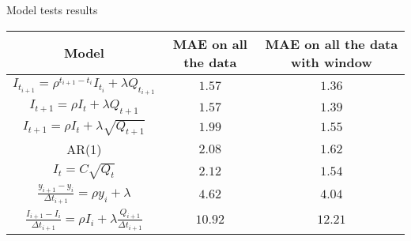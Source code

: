 \documentclass[aspectratio=169]{beamer}
\begin{document}
\begin{frame}{Model tests results}
    \begin{tabular}{|c | c | c|} 


        \hline
        Model & MAE on all the data & MAE on all the data with window  \\
        \hline
        $I_{t_{i+1}} = \rho ^{t_{i+1} - t_i} I_{t_i} + \lambda Q_{t_{i+1}}$ & $1.57$ & $1.36$  \\  
        \hline
        $I_{t+1} = \rho I_t + \lambda Q_{t+1}$ & $1.57$ & $1.39$ \\
        \hline
        $I_{t+1} = \rho I_t + \lambda \sqrt{Q_{t+1}}$ & $1.99$ & $1.55$  \\
        \hline
        AR(1) & $2.08$ & $1.62$  \\
        \hline
        $I_t = C \sqrt{Q_t}$ & $2.12$ & $1.54$ \\
        \hline
        $\frac{y_{i + 1} - y_{i}}{\Delta t_{i+1}} = \rho y_i + \lambda$ & $4.62$ & $4.04$ \\
        \hline
        $\frac{I_{i+1} - I_i}{\Delta t _{i+1}} = \rho I_i + \lambda \frac{Q_{i+1}}{\Delta t _{i+1}}$ & $10.92$ & $12.21$  \\
        \hline
    \end{tabular}
\end{frame}
\end{document}

